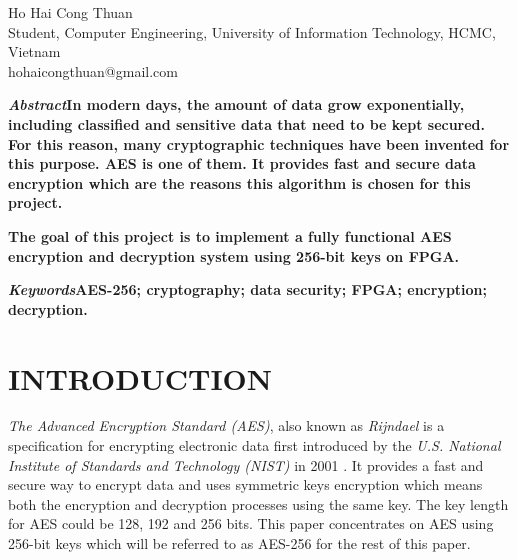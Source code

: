 \documentclass[a4paper, 10pt]{article}
\begin{document}
    \title{}
    \author{}
    \maketitle %

    \begin{center}
        Ho Hai Cong Thuan\\
        Student, Computer Engineering, University of Information Technology, HCMC, Vietnam\\
        hohaicongthuan@gmail.com
    \end{center}
    \begin{multicols}{2}
        
        \textbf{\textit{Abstract\textemdash}In modern days, the amount of data grow exponentially, including classified and sensitive data that need to be kept secured. For this reason, many cryptographic techniques have been invented for this purpose. AES is one of them. It provides fast and secure data encryption which are the reasons this algorithm is chosen for this project.}

        \textbf{The goal of this project is to implement a fully functional AES encryption and decryption system using 256-bit keys on FPGA.}
        
        \bigskip

        \textbf{\textit{Keywords\textemdash}AES-256; cryptography; data security; FPGA; encryption; decryption.}

        \section{INTRODUCTION}
            \textit{The Advanced Encryption Standard (AES)}, also known as \textit{Rijndael} is a specification for encrypting electronic data first introduced by the \textit{U.S. National Institute of Standards and Technology (NIST)} in 2001 \cite{AES}. It provides a fast and secure way to encrypt data and uses symmetric keys encryption which means both the encryption and decryption processes using the same key. The key length for AES could be 128, 192 and 256 bits. This paper concentrates on AES using 256-bit keys which will be referred to as AES-256 for the rest of this paper.
            

\end{multicols}
\end{document}
